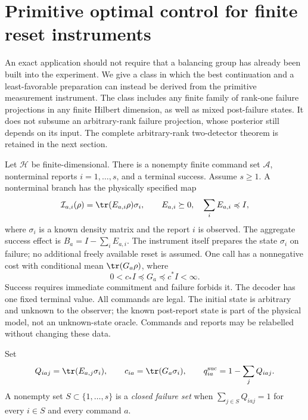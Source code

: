 \section{Primitive optimal control for finite reset instruments}\label{sec:reset-control}
An exact application should not require that a balancing group has already been built into the experiment. We give a class in which the best continuation and a least-favorable preparation can instead be derived from the primitive measurement instrument. The class includes any finite family of rank-one failure projections in any finite Hilbert dimension, as well as mixed post-failure states. It does not subsume an arbitrary-rank failure projection, whose posterior still depends on its input. The complete arbitrary-rank two-detector theorem is retained in the next section.

Let $\mathcal H$ be finite-dimensional. There is a nonempty finite command set $\mathcal A$, nonterminal reports $i=1,\ldots,s$, and a terminal success. Assume $s\ge1$. A nonterminal branch has the physically specified map
\begin{equation}\label{eq:reset-instrument}
 \mathcal I_{a,i}(\rho)=\tr(E_{a,i}\rho)\sigma_i,
 \qquad E_{a,i}\succeq0,\quad \sum_i E_{a,i}\preccurlyeq I,
\end{equation}
where $\sigma_i$ is a known density matrix and the report $i$ is observed. The aggregate success effect is $B_a=I-\sum_iE_{a,i}$. The instrument itself prepares the state $\sigma_i$ on failure; no additional freely available reset is assumed. One call has a nonnegative cost with conditional mean $\tr(G_a\rho)$, where
\[
 0<c_*I\preccurlyeq G_a\preccurlyeq c^*I<\infty.
\]
Success requires immediate commitment and failure forbids it. The decoder has one fixed terminal value. All commands are legal. The initial state is arbitrary and unknown to the observer; the known post-report state is part of the physical model, not an unknown-state oracle. Commands and reports may be relabelled without changing these data.

Set
\[
 Q_{iaj}=\tr(E_{a,j}\sigma_i),\qquad c_{ia}=\tr(G_a\sigma_i),
 \qquad q_{ia}^{\rm suc}=1-\sum_jQ_{iaj}.
\]
A nonempty set $S\subset\{1,\ldots,s\}$ is a \emph{closed failure set} when $\sum_{j\in S}Q_{iaj}=1$ for every $i\in S$ and every command $a$.

